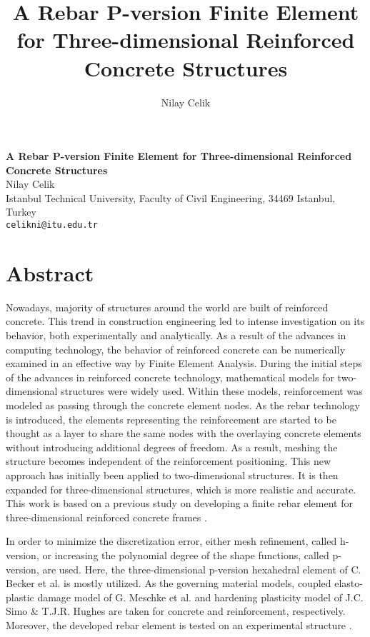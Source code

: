 \title{A Rebar P-version Finite Element for Three-dimensional Reinforced Concrete Structures}
\author{Nilay Celik} 

\begin{center}

\textbf{\Large A Rebar P-version Finite Element for Three-dimensional Reinforced Concrete Structures}\\
\vspace{10mm}
{\large  Nilay Celik}\\
Istanbul Technical University, Faculty of Civil Engineering, 34469 Istanbul, Turkey\\
{\tt celikni@itu.edu.tr}

\end{center}

\section*{Abstract}

Nowadays, majority of structures around the world are built of reinforced concrete. This trend in construction engineering led to intense investigation on its behavior, both experimentally and analytically. As a result of the advances in computing technology, the behavior of reinforced concrete can be numerically examined in an effective way by Finite Element Analysis. During the initial steps of the advances in reinforced concrete technology, mathematical models for two-dimensional structures were widely used. Within these models, reinforcement was modeled as passing through the concrete element nodes. As the rebar technology is introduced, the elements representing the reinforcement are started to be thought as a layer to share the same nodes with the overlaying concrete elements without introducing additional degrees of freedom. As a result, meshing the structure becomes independent of the reinforcement positioning. This new approach has initially been applied to two-dimensional structures. It is then expanded for three-dimensional structures, which is more realistic and accurate. This work is based on a previous study on developing a finite rebar element for three-dimensional reinforced concrete frames \cite{Celik04}.

In order to minimize the discretization error, either mesh refinement, called h-version, or increasing the polynomial degree of the shape functions, called p-version, are used. Here, the three-dimensional p-version hexahedral element of C. Becker et al. \cite{Becker09} is mostly utilized. As the governing material models, coupled elasto-plastic damage model of G. Meschke et al. \cite{Meschke98} and hardening plasticity model of J.C. Simo \& T.J.R. Hughes \cite{Simo98} are taken for concrete and reinforcement, respectively. Moreover, the developed rebar element is tested on an experimental structure \cite{Tsuchiya02}.



